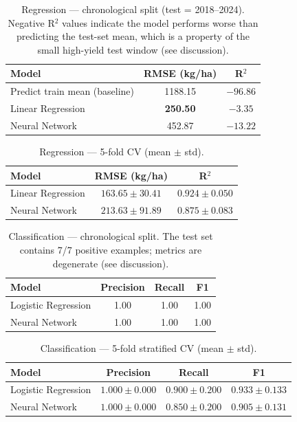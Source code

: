 \documentclass[conference]{IEEEtran}
\begin{document}
\begin{table}[H]
  \centering
  \caption{Regression --- chronological split (test = 2018--2024). Negative R$^2$ values indicate the model performs worse than predicting the test-set mean, which is a property of the small high-yield test window (see discussion).}
  \begin{tabular}{lcc}
    \toprule
    \textbf{Model} & \textbf{RMSE} (kg/ha) & \textbf{R$^2$} \\
    \midrule
    Predict train mean (baseline) & 1188.15 & $-96.86$ \\
    Linear Regression             & \textbf{250.50}  & $-3.35$ \\
    Neural Network                & 452.87  & $-13.22$ \\
    \bottomrule
  \end{tabular}
  \label{tab:regression_chrono}
\end{table}

\begin{table}[H]
  \centering
  \caption{Regression --- 5-fold CV (mean $\pm$ std).}
  \begin{tabular}{lcc}
    \toprule
    \textbf{Model} & \textbf{RMSE} (kg/ha) & \textbf{R$^2$} \\
    \midrule
    Linear Regression & $\mathbf{163.65 \pm 30.41}$ & $\mathbf{0.924 \pm 0.050}$ \\
    Neural Network    & $213.63 \pm 91.89$ & $0.875 \pm 0.083$ \\
    \bottomrule
  \end{tabular}
  \label{tab:regression_cv}
\end{table}

\begin{table}[H]
  \centering
  \caption{Classification --- chronological split. The test set contains 7/7 positive examples; metrics are degenerate (see discussion).}
  \begin{tabular}{lccc}
    \toprule
    \textbf{Model} & \textbf{Precision} & \textbf{Recall} & \textbf{F1} \\
    \midrule
    Logistic Regression & 1.00 & 1.00 & 1.00 \\
    Neural Network      & 1.00 & 1.00 & 1.00 \\
    \bottomrule
  \end{tabular}
  \label{tab:classification_chrono}
\end{table}

\begin{table}[H]
  \centering
  \caption{Classification --- 5-fold stratified CV (mean $\pm$ std).}
  \begin{tabular}{lccc}
    \toprule
    \textbf{Model} & \textbf{Precision} & \textbf{Recall} & \textbf{F1} \\
    \midrule
    Logistic Regression & $1.000 \pm 0.000$ & $0.900 \pm 0.200$ & $\mathbf{0.933 \pm 0.133}$ \\
    Neural Network      & $1.000 \pm 0.000$ & $0.850 \pm 0.200$ & $0.905 \pm 0.131$ \\
    \bottomrule
  \end{tabular}
  \label{tab:classification_cv}
\end{table}
\end{document}
